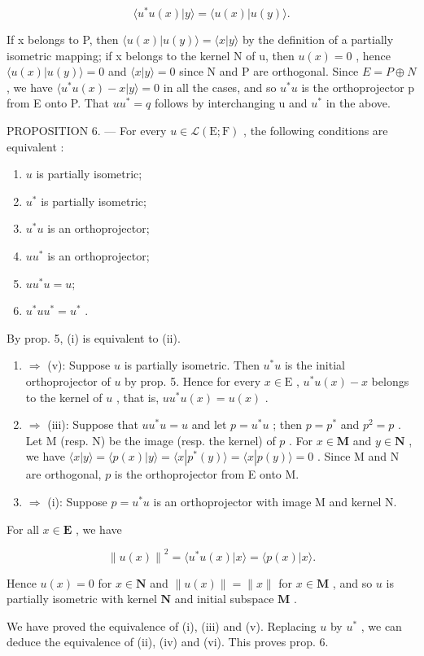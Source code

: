 \[
\langle u ^ {*} u (x) | y \rangle = \langle u (x) | u (y) \rangle .
\]

If x belongs to P, then \(\langle u(x)|u(y)\rangle = \langle x|y\rangle\) by the definition of a partially isometric mapping; if x belongs to the kernel N of u, then \(u(x) = 0\) , hence \(\langle u(x)|u(y)\rangle = 0\) and \(\langle x|y\rangle = 0\) since N and P are orthogonal. Since \(E = P \oplus N\) , we have \(\langle u^{*}u(x) - x|y\rangle = 0\) in all the cases, and so \(u^{*}u\) is the orthoprojector p from E onto P. That \(uu^{*} = q\) follows by interchanging u and \(u^{*}\) in the above.

PROPOSITION 6. --- For every \(u \in \mathcal{L}(\mathrm{E};\mathrm{F})\) , the following conditions are equivalent :

\begin{enumerate}
\def\labelenumi{(\roman{enumi})}
\item
  \(u\) is partially isometric;
\item
  \(u^{*}\) is partially isometric;
\item
  \(u^{*}u\) is an orthoprojector;
\item
  \(uu^{*}\) is an orthoprojector;
\item
  \(uu^{*}u = u;\)
\item
  \(u^{*}uu^{*} = u^{*}\) .
\end{enumerate}

By prop. 5, (i) is equivalent to (ii).

\begin{enumerate}
\def\labelenumi{(\roman{enumi})}
\item
  \(\Rightarrow\) (v): Suppose \(u\) is partially isometric. Then \(u^{*}u\) is the initial orthoprojector of \(u\) by prop. 5. Hence for every \(x \in \mathrm{E}\) , \(u^{*}u(x) - x\) belongs to the kernel of \(u\) , that is, \(uu^{*}u(x) = u(x)\) .
\item
  \(\Rightarrow\) (iii): Suppose that \(uu^{*}u = u\) and let \(p = u^{*}u\) ; then \(p = p^{*}\) and \(p^2 = p\) . Let M (resp. N) be the image (resp. the kernel) of \(p\) . For \(x \in \mathbf{M}\) and \(y \in \mathbf{N}\) , we have \(\langle x|y\rangle = \langle p(x)|y\rangle = \langle x|p^{*}(y)\rangle = \langle x|p(y)\rangle = 0\) . Since M and N are orthogonal, \(p\) is the orthoprojector from E onto M.
\item
  \(\Rightarrow\) (i): Suppose \(p = u^{*}u\) is an orthoprojector with image M and kernel N.
\end{enumerate}

For all \(x\in \mathbf{E}\) , we have

\[
\left\| u (x) \right\| ^ {2} = \langle u ^ {*} u (x) | x \rangle = \langle p (x) | x \rangle .
\]

Hence \(u(x) = 0\) for \(x \in \mathbf{N}\) and \(\| u(x) \| = \| x \|\) for \(x \in \mathbf{M}\) , and so \(u\) is partially isometric with kernel \(\mathbf{N}\) and initial subspace \(\mathbf{M}\) .

We have proved the equivalence of (i), (iii) and (v). Replacing \(u\) by \(u^*\) , we can deduce the equivalence of (ii), (iv) and (vi). This proves prop. 6.
